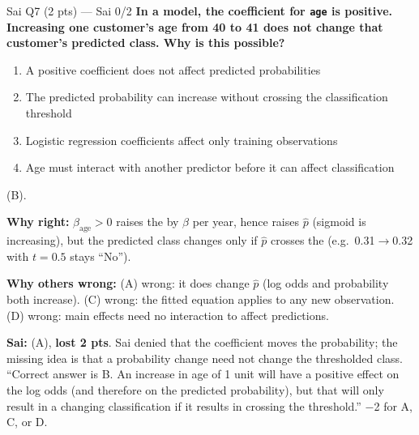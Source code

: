 \begin{qbox}{Sai Q7 (2 pts) --- Sai 0/2}
\textbf{In a  model, the coefficient for \texttt{age} is positive. Increasing one customer's age from 40 to 41 does not change that customer's predicted class. Why is this possible?}
\begin{enumerate}[label=(\Alph*),leftmargin=1.6em,itemsep=0pt]
\item A positive coefficient does not affect predicted probabilities
\item The predicted probability can increase without crossing the classification threshold
\item Logistic regression coefficients affect only training observations
\item Age must interact with another predictor before it can affect classification
\end{enumerate}
\ans (B).
\par\textbf{Why right:} $\beta_{\text{age}}>0$ raises the  by $\beta$ per year, hence raises $\hat p$ (sigmoid is increasing), but the predicted class changes only if $\hat p$ crosses the  (e.g.\ 0.31$\to$0.32 with $t=0.5$ stays ``No''). 
\par\textbf{Why others wrong:}
(A) wrong: it does change $\hat p$ (log odds and probability both increase).
(C) wrong: the fitted equation applies to any new observation.
(D) wrong: main effects need no interaction to affect predictions.
\par\textbf{\color{dblue}Sai:} (A), \textbf{lost 2 pts}. Sai denied that the coefficient moves the probability; the missing idea is that a probability change need not change the thresholded class. \grader ``Correct answer is B. An increase in age of 1 unit will have a positive effect on the log odds (and therefore on the predicted probability), but that will only result in a changing classification if it results in crossing the threshold.'' $-$2 for A, C, or D.
\end{qbox}


